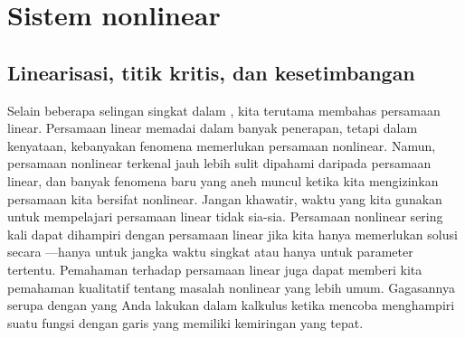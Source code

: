 \chapter{Sistem nonlinear} \label{nlin:chapter}


\section{Linearisasi, titik kritis, dan kesetimbangan}
\label{linearization:section}




Selain beberapa selingan singkat dalam ,
kita terutama membahas persamaan
linear. Persamaan linear memadai dalam banyak penerapan, tetapi dalam kenyataan,
kebanyakan fenomena memerlukan persamaan nonlinear. Namun, persamaan nonlinear
terkenal jauh lebih sulit dipahami daripada persamaan linear, dan
banyak fenomena baru yang aneh muncul ketika kita mengizinkan persamaan kita
bersifat nonlinear.
Jangan khawatir, waktu yang kita gunakan untuk mempelajari persamaan linear tidak sia-sia.
Persamaan nonlinear sering kali dapat dihampiri dengan persamaan linear jika kita hanya memerlukan
solusi secara ---hanya untuk jangka waktu singkat atau
hanya untuk parameter tertentu. Pemahaman terhadap persamaan linear juga dapat
memberi kita pemahaman kualitatif tentang masalah nonlinear yang lebih umum.
Gagasannya serupa dengan yang Anda lakukan dalam kalkulus ketika mencoba
menghampiri suatu fungsi dengan garis yang memiliki kemiringan yang tepat.

